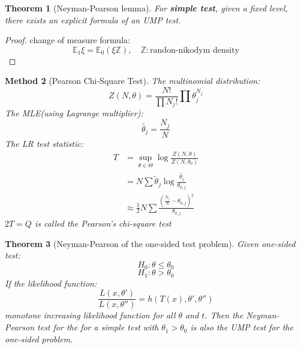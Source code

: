 \documentclass[a4paper,12pt, oneside, fleqn]{book}
\newtheorem{theorem}{Theorem}[section]
\newtheorem{method}[theorem]{Method}
\theoremstyle{definition}
\theoremstyle{remark}
\begin{document}
\begin{theorem}[Neyman-Pearson lemma]
For \textbf{simple test}, given a fixed level, there exists an explicit formula of an UMP test.
\end{theorem}
\begin{proof}
	change of measure formula:
	\begin{equation*}
		\mathbb{E}_1 \xi = \mathbb{E}_0 (\xi \mathbb{Z}), \quad \mathbb{Z}: \text{randon-nikodym density}
	\end{equation*}
\end{proof}


\begin{method}[Pearson Chi-Square Test]
The multinomial distribution:
\begin{equation}
	Z(N, \theta) = \frac{N!}{\prod N_j !} \prod \theta_j^{N_j}
\end{equation}
The MLE(using Lagrange multiplier):
\begin{equation*}
	\tilde{\theta_j} = \frac{N_j}{N}
\end{equation*}
The LR test statistic:
\begin{align*}
	T &= \sup_{\theta \in \Theta} \log \frac{Z(N, \theta)}{Z(N, \theta_0)}\\
	&= N \sum \tilde{\theta}_j \log \frac{\tilde{\theta_j}}{\theta_{0, j}}\\
	&\approx \frac{1}{2} N \sum \frac{(\frac{N_j}{N} - \theta_{0, j})^2}{\theta_{0, j}}
\end{align*}
$2T = Q$ is called the Pearson's chi-square test
\end{method}





\begin{theorem}[Neyman-Pearson of the one-sided test problem]
Given one-sided test:
\begin{equation*}
    H_{0}: \theta \leq \theta_{0}
\end{equation*}
\begin{equation*}
        H_{1}: \theta > \theta_{0}
\end{equation*}
If the likelihood function:
\begin{equation*}
    \frac{L(x, \theta')}{L(x, \theta'')} = h(T(x), \theta', \theta'')
\end{equation*}
monotone increasing likelihood function for all $\theta$ and $t$. Then the Neyman-Pearson test for the for a simple test with $\theta_1 > \theta_0$ is also the UMP test for the one-sided problem.
\end{theorem}
\end{document}
